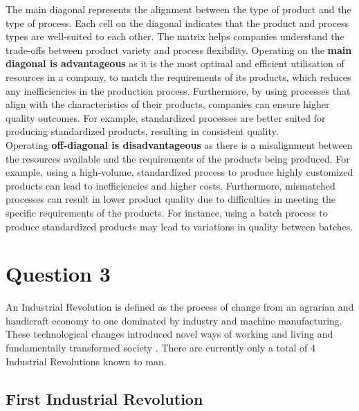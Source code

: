 \documentclass[12pt]{article}
\begin{document}
The main diagonal represents the alignment between the type of product and the type of process. Each cell on the diagonal indicates that the product and process types are well-suited to each other. The matrix helps companies understand the trade-offs between product variety and process flexibility. Operating on the \textbf{main diagonal is advantageous} as it is the most optimal and efficient utilisation of resources in a company, to match the requirements of its products, which reduces any inefficiencies in the production process. Furthermore, by using processes that align with the characteristics of their products, companies can ensure higher quality outcomes. For example, standardized processes are better suited for producing standardized products, resulting in consistent quality. \\ 

\noindent Operating \textbf{off-diagonal is disadvantageous} as there is a misalignment between the resources available and the requirements of the products being produced. For example, using a high-volume, standardized process to produce highly customized products can lead to inefficiencies and higher costs. Furthermore, mismatched processes can result in lower product quality due to difficulties in meeting the specific requirements of the products. For instance, using a batch process to produce standardized products may lead to variations in quality between batches.

\newpage

\section*{Question 3}



An Industrial Revolution is defined as the process of change from an agrarian and handicraft economy to one dominated by industry and machine manufacturing. These technological changes introduced novel ways of working and living and fundamentally transformed society \cite{Britannica_2024}. There are currently only a total of 4 Industrial Revolutions known to man. 

\subsection*{First Industrial Revolution}
\end{document}
